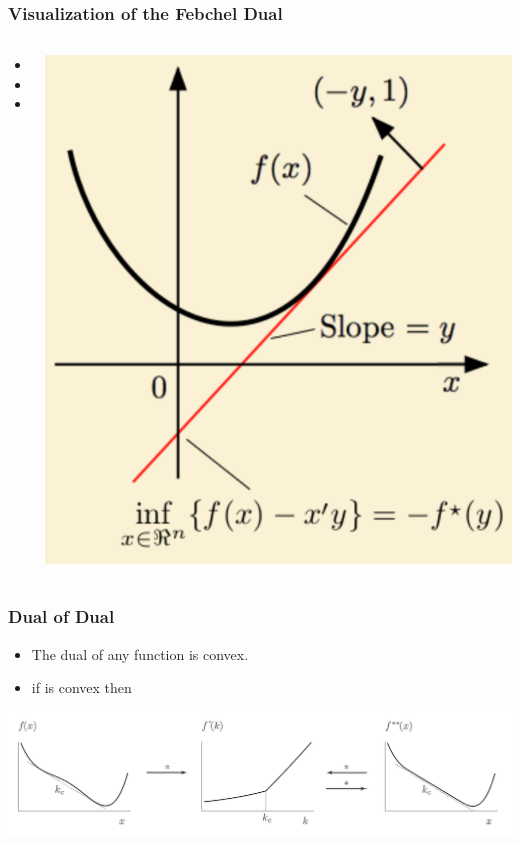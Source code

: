 \documentclass[handout]{beamer}
\begin{document}
\begin{frame}
  \frametitle{Visualization of the Febchel Dual}
  \begin{columns}
    \begin{column}{0.55\textwidth}
        \begin{itemize}
            \item {}
            \item {}
            \item {}
        \end{itemize}
    \end{column}
    \begin{column}{0.43\textwidth}
          \includegraphics[width=\textwidth]{figures/Legendre-Duality.png}
    \end{column}
\end{columns}
\end{frame}

\begin{frame}
  \frametitle{Dual of Dual}
  \begin{itemize}
  \item The dual of any function is convex.
  \item if  is convex then 
  \end{itemize}
  \includegraphics[width=\textwidth]{figures/FromNonConvexToConvex.png}  
\end{frame}
\end{document}

